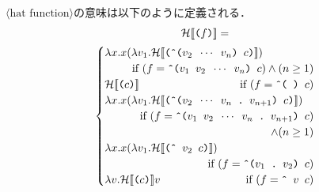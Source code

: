 \documentclass[twocolumn]{jarticle}
\def\hat{\mbox{\^{ }}}
\newcommand{\NT}[1]{\ensuremath{\langle\mbox{#1}\rangle}\allowbreak}
\newcommand{\dlrBrack}[1]{\ensuremath{[\![#1]\allowbreak\!]}}
\newcommand{\C}[1]{\mbox{\tt#1}}
\newcommand{\D}{\mbox{\tt\ .\ }}
\newcommand{\sH}[1]{\ensuremath{\mathcal{H}}\dlrBrack{\mbox{\tt#1}}}
\newcommand{\FV}[1]{\ensuremath{\mathcal{F}}\dlrBrack{\C{#1}}}
\begin{document}
\NT{hat function}の意味は以下のように定義される．
\begin{multline}
  \sH{($f$)}= \\
  \begin{cases}
    \lambda x.x(\lambda v_1.\sH{(\hat($v_2\ \cdots\ v_n$) $c$)}) \\
    & \llap{if $(f=\C{\hat($v_1\ v_2\ \cdots\ v_n$) $c$})\land(n\geq 1)$} \\
    \sH{($c$)} & \llap{if $(f=\C{\hat( ) $c$})$} \\
    \lambda x.x(\lambda v_1.\sH{(\hat($v_2\ \cdots\ v_n\D v_{n+1}$) $c$)}) \\
    & \llap{if $(f=\C{\hat($v_1\ v_2\ \cdots\ v_n\D v_{n+1}$) $c$})$} \\
    & \llap{$\land(n\geq 1)$} \\
    \lambda x.x(\lambda v_1.\sH{(\hat$\ v_2\ c$)}) \\
    & \llap{if $(f=\C{\hat($v_1\D v_2$) $c$})$} \\
    \lambda v.\sH{($c$)}v & \llap{if $(f=\C{\hat\ $v\ c$})$}
  \end{cases}
\end{multline}
\end{document}
